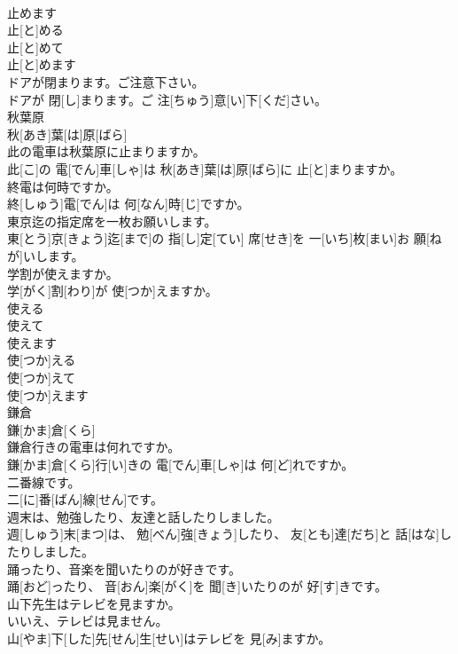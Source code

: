 \documentclass[8pt]{extreport}
\begin{document}
\begin{CJK}{UTF8}{min}
\\	止めます	
\\	止[と]める 
\\	止[と]めて 
\\	止[と]めます	
\\	ドアが閉まります。ご注意下さい。	
\\	ドアが 閉[し]まります。ご 注[ちゅう]意[い]下[くだ]さい。
\\	秋葉原	
\\	秋[あき]葉[は]原[ばら]	
\\	此の電車は秋葉原に止まりますか。	
\\	此[こ]の 電[でん]車[しゃ]は 秋[あき]葉[は]原[ばら]に 止[と]まりますか。
\\	終電は何時ですか。	
\\	終[しゅう]電[でん]は 何[なん]時[じ]ですか。
\\	東京迄の指定席を一枚お願いします。	
\\	東[とう]京[きょう]迄[まで]の 指[し]定[てい] 席[せき]を 一[いち]枚[まい]お 願[ねが]いします。
\\	学割が使えますか。	
\\	学[がく]割[わり]が 使[つか]えますか。
\\	使える 
\\	使えて 
\\	使えます	
\\	使[つか]える 
\\	使[つか]えて 
\\	使[つか]えます	
\\	鎌倉	
\\	鎌[かま]倉[くら]	
\\	鎌倉行きの電車は何れですか。	
\\	鎌[かま]倉[くら]行[い]きの 電[でん]車[しゃ]は 何[ど]れですか。
\\	二番線です。	
\\	二[に]番[ばん]線[せん]です。
\\	週末は、勉強したり、友達と話したりしました。	
\\	週[しゅう]末[まつ]は、 勉[べん]強[きょう]したり、 友[とも]達[だち]と 話[はな]したりしました。
\\	踊ったり、音楽を聞いたりのが好きです。	
\\	踊[おど]ったり、 音[おん]楽[がく]を 聞[き]いたりのが 好[す]きです。
\\	山下先生はテレビを見ますか。 
\\	いいえ、テレビは見ません。	
\\	山[やま]下[した]先[せん]生[せい]はテレビを 見[み]ますか。 

\end{CJK}
\end{document}

